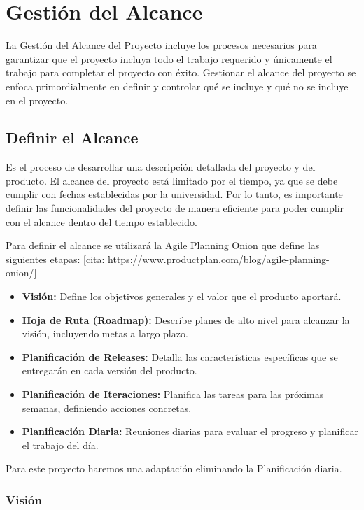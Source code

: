 \section{Gestión del Alcance}\label{sec:gestionDelAlcance}

La Gestión del Alcance del Proyecto incluye los procesos necesarios para garantizar que el proyecto incluya todo el 
trabajo requerido y únicamente el trabajo para completar el proyecto con éxito. Gestionar el alcance del proyecto se 
enfoca primordialmente en definir y controlar qué se incluye y qué no se incluye en el proyecto.

\subsection{Definir el Alcance}

Es el proceso de desarrollar una descripción detallada del proyecto y del producto. El alcance del proyecto está limitado 
por el tiempo, ya que se debe cumplir con fechas establecidas por la universidad. Por lo tanto, es importante definir las 
funcionalidades del proyecto de manera eficiente para poder cumplir con el alcance dentro del tiempo establecido.

Para definir el alcance se utilizará la Agile Planning Onion que define las siguientes etapas:
[cita: https://www.productplan.com/blog/agile-planning-onion/]

\begin{itemize}
    \item \textbf{Visión:} Define los objetivos generales y el valor que el producto aportará.
    \item \textbf{Hoja de Ruta (Roadmap):} Describe planes de alto nivel para alcanzar la visión, incluyendo metas a largo plazo.
    \item \textbf{Planificación de Releases:} Detalla las características específicas que se entregarán en cada versión del producto.
    \item \textbf{Planificación de Iteraciones:} Planifica las tareas para las próximas semanas, definiendo acciones concretas.
    \item \textbf{Planificación Diaria:} Reuniones diarias para evaluar el progreso y planificar el trabajo del día.
\end{itemize}

Para este proyecto haremos una adaptación eliminando la Planificación diaria.

\subsubsection{Visión}

